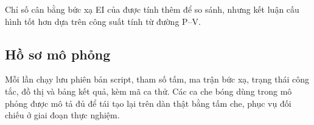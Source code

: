 Chỉ số cân bằng bức xạ EI của \cite{thanh} được tính thêm để so sánh, nhưng kết luận cấu hình tốt hơn dựa trên công suất tính từ đường P--V.

\subsection{Hồ sơ mô phỏng}

Mỗi lần chạy lưu phiên bản script, tham số tấm, ma trận bức xạ, trạng thái công tắc, đồ thị và bảng kết quả, kèm mã ca thử. Các ca che bóng dùng trong mô phỏng được mô tả đủ để tái tạo lại trên dàn thật bằng tấm che, phục vụ đối chiếu ở giai đoạn thực nghiệm.
